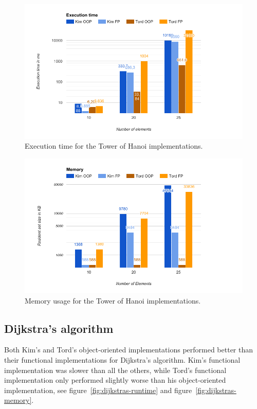 \documentclass {article}
\begin{document}
\begin{figure}[H]
\centering
\includegraphics[width=\textwidth]{hanoi-runtime}

\caption{Execution time for the Tower of Hanoi implementations.}
\label{fig:hanoi-runtime}
\end{figure}
 
\begin{figure}[H]
\centering
\includegraphics[width=\textwidth]{hanoi-memory}

\caption{Memory usage for the Tower of Hanoi implementations.}
\label{fig:hanoi-memory}
\end{figure}
\subsection{Dijkstra's algorithm}
Both Kim's and Tord's object-oriented implementations performed better than their functional implementations for Dijkstra's algorithm. Kim's functional implementation was slower than all the others, while Tord's functional implementation only performed slightly worse than his object-oriented implementation, see figure~\ref{fig:dijkstras-runtime} and figure~\ref{fig:dijkstras-memory}. 
 
\end{document}
